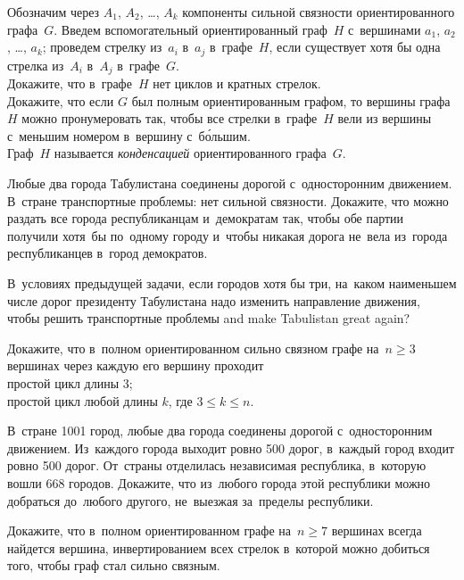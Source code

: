\begin{problems}

\item
Обозначим через $A_{1}$, $A_{2}$, \ldots, $A_{k}$ компоненты сильной связности
ориентированного графа~$G$.
Введем вспомогательный ориентированный граф~$H$ с~вершинами
$a_{1}$, $a_{2}$, \ldots, $a_{k}$;
проведем стрелку из~$a_{i}$ в~$a_{j}$ в~графе~$H$, если существует хотя бы одна
стрелка из~$A_{i}$ в~$A_{j}$ в~графе~$G$.
\\
\subproblem
Докажите, что в~графе~$H$ нет циклов и кратных стрелок.
\\
\subproblem
Докажите, что если $G$ был полным ориентированным графом, то вершины графа~$H$
можно пронумеровать так, чтобы все стрелки в~графе~$H$ вели из вершины
с~меньшим номером в~вершину с~б\'{о}льшим.
\\
Граф~$H$ называется \emph{конденсацией} ориентированного графа~$G$.

\item
Любые два города Табулистана соединены дорогой с~односторонним движением.
В~стране транспортные проблемы: нет сильной связности.
Докажите, что можно раздать все города республиканцам и~демократам так, чтобы
обе партии получили хотя~бы по~одному городу и~чтобы никакая дорога не~вела
из~города республиканцев в~город демократов.

\item
В~условиях предыдущей задачи, если городов хотя бы три, на~каком наименьшем
числе дорог президенту Табулистана надо изменить направление движения, чтобы
решить транспортные проблемы and make Tabulistan great again?

\item
Докажите, что в~полном ориентированном сильно связном графе на~$n \geq 3$
вершинах через каждую его вершину проходит
\\
\subproblem простой цикл длины $3$;
\\
\subproblem простой цикл любой длины $k$, где $3 \leq k \leq n$.

\item
В~стране 1001 город, любые два города соединены дорогой с~односторонним
движением.
Из~каждого города выходит ровно 500 дорог, в~каждый город входит ровно 500
дорог.
От~страны отделилась независимая республика, в~которую вошли 668 городов.
Докажите, что из~любого города этой республики можно добраться до~любого
другого, не~выезжая за~пределы республики.

\item
Докажите, что в~полном ориентированном графе на~$n \geq 7$ вершинах всегда
найдется вершина, инвертированием всех стрелок в~которой можно добиться того,
чтобы граф стал сильно связным.


\end{problems}
